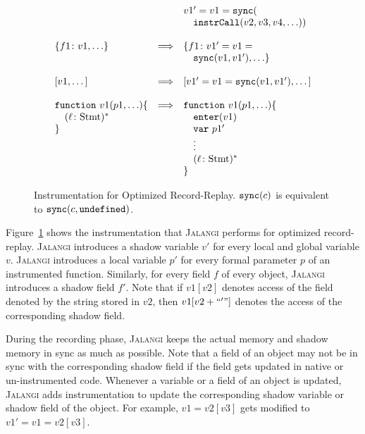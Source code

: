 \documentclass{sig-alternate}
\def\jalangi{\textsc{Jalangi}}
\newcommand \dsl [1] {\ensuremath{{\tt #1}}\xspace}
\newcommand \Sync{\dsl{sync}}
\newcommand \Enter{\dsl{enter}}
\begin{document}
\begin{figure}
{\[\begin{array}{lrl}
& & v1' = v1 = \Sync(\\
& & \quad\dsl{instrCall}(v2, v3, v4, \ldots))\\
& & \\
  \{f1\colon v1, \ldots\} & \Longrightarrow &\{f1\colon v1' = v1 =\\
& &\quad  \Sync(v1, v1'), \ldots\} \\
& & \\
  \mbox{[}v1, \ldots\mbox{]} & \Longrightarrow & \mbox{[}v1' = v1 =
  \Sync(v1, v1'), \ldots\mbox{]} \\
& & \\
    \dsl{function}\ v1(p1, \ldots) \{ & \Longrightarrow &  \dsl{function}\ v1 (p1, \ldots) \{\\
\quad (\ell\colon \mbox{Stmt})^* & & \quad \Enter(v1)\\
\} & & \quad \dsl{var}\ p1'\\
& & \quad \vdots\\
& & \quad  (\ell\colon \mbox{Stmt})^*\\
& & \}\\
\end{array}
\]}
\caption{Instrumentation for Optimized Record-Replay. $\Sync(c)$ is
  equivalent to $\Sync(c, \dsl{undefined})$.}
\label{fig:instr2}
\end{figure}
 
Figure~\ref{fig:instr2} shows the instrumentation that \jalangi{}
performs for optimized record-replay.  \jalangi{} introduces a shadow
variable $v'$ for every local and global variable $v$.  \jalangi{}
introduces a local variable $p'$ for every formal parameter $p$ of an
instrumented function.  Similarly, for every field $f$ of every
object, \jalangi{} introduces a shadow field $f'$.  Note that if
$v1[v2]$ denotes access of the field denoted by the string stored in
$v2$, then $v1[v2+``'"]$ denotes the access of the corresponding
shadow field.

During the recording phase, \jalangi{} keeps the actual memory and
shadow memory in sync as much as possible.  Note that a field of an
object may not be in sync with the corresponding shadow field if the
field gets updated in native or un-instrumented code.  Whenever a
variable or a field of an object is updated, \jalangi{} adds
instrumentation to update the corresponding shadow variable or shadow
field of the object.  For example, $v1 = v2[v3]$ gets modified to $v1'
= v1 = v2[v3]$.
\end{document}
